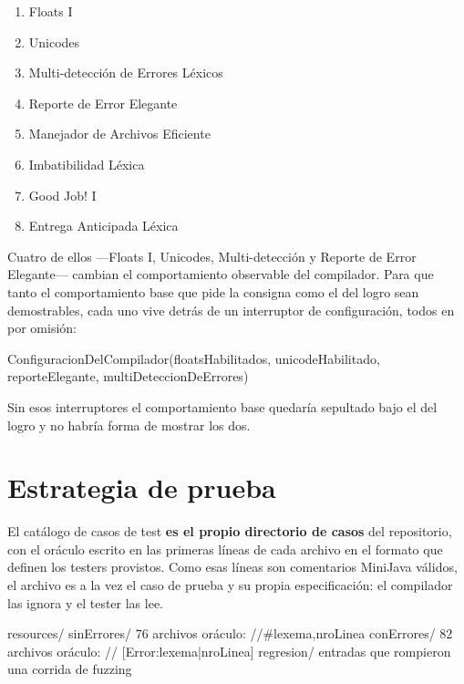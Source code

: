 \documentclass[11pt,a4paper]{article}
\begin{document}
\begin{enumerate}[leftmargin=1.8em,itemsep=0.3ex]
\item Floats I
\item Unicodes
\item Multi-detección de Errores Léxicos
\item Reporte de Error Elegante
\item Manejador de Archivos Eficiente
\item Imbatibilidad Léxica
\item Good Job! I
\item Entrega Anticipada Léxica
\end{enumerate}

Cuatro de ellos ---Floats I, Unicodes, Multi-detección y Reporte de Error Elegante--- cambian el
comportamiento observable del compilador. Para que tanto el comportamiento base que pide la consigna
como el del logro sean demostrables, cada uno vive detrás de un interruptor de configuración, todos
en  por omisión:

\begin{codigoLlano}
ConfiguracionDelCompilador(floatsHabilitados, unicodeHabilitado,
                           reporteElegante, multiDeteccionDeErrores)
\end{codigoLlano}

Sin esos interruptores el comportamiento base quedaría sepultado bajo el del logro y no habría forma
de mostrar los dos.

\section{Estrategia de prueba}

El catálogo de casos de test \textbf{es el propio directorio de casos} del repositorio, con el
oráculo escrito en las primeras líneas de cada archivo en el formato que definen los testers
provistos. Como esas líneas son comentarios MiniJava válidos, el archivo es a la vez el caso de
prueba y su propia especificación: el compilador las ignora y el tester las lee.

\begin{codigoLlano}
resources/
    sinErrores/    76 archivos   oráculo: //#lexema,nroLinea
    conErrores/    82 archivos   oráculo: // [Error:lexema|nroLinea]
    regresion/                   entradas que rompieron una corrida de fuzzing
\end{codigoLlano}
\end{document}
